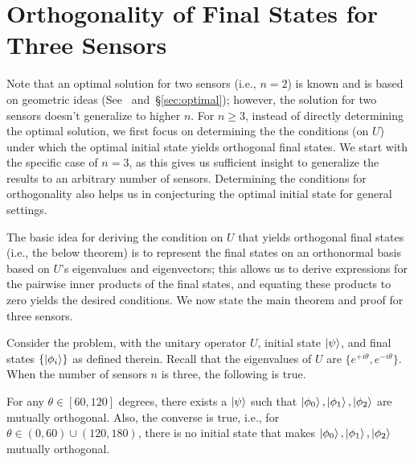 \section{\bf Orthogonality of Final States for Three Sensors}
\label{sec:three-ortho}

Note that an optimal solution for two sensors (i.e., $n=2$) is known and is based on geometric ideas (See~\cite{Hillery_2023} and~\S\ref{sec:optimal}); however,
the solution for two sensors doesn't generalize to higher $n$.
For $n \geq 3$, instead of directly determining the optimal solution, we first focus on determining the
the conditions (on $U$) under which the optimal initial state yields orthogonal final states. 
We start with the specific case of $n=3$,
as this gives us sufficient insight to generalize the results to 
an arbitrary number of sensors. 
Determining the conditions for orthogonality also helps us in conjecturing the optimal initial state for general settings. 

The basic idea for deriving the condition on $U$ that yields orthogonal final states (i.e., the below theorem) is to represent the final states on an orthonormal basis based on $U$'s eigenvalues and eigenvectors; this allows us to derive expressions for the pairwise inner products of the final states, and equating these products to zero yields the desired conditions. We now state the main theorem and proof for three sensors.

\begin{thm-prf}
Consider the \iso problem, with the unitary operator $U$, initial state $\ket{\psi}$,
and final states $\{\ket{\phi_i}\}$ as defined therein. Recall that the eigenvalues of
$U$ are $\{e^{+i\theta}, e^{-i\theta}\}$. When the number of sensors $n$ is three, the following is true.

For any $\theta \in [60, 120]$ degrees, there exists a $\ket{\psi}$ such that $\ket{\phi_0}, \ket{\phi_1}, \ket{\phi_2}$ are mutually orthogonal.
Also, the converse is true, i.e., for $\theta \in (0, 60) \cup (120, 180)$, there is
no initial state that makes $\ket{\phi_0}, \ket{\phi_1}, \ket{\phi_2}$ mutually orthogonal.
\label{thm:3sensor}
\end{thm-prf}

